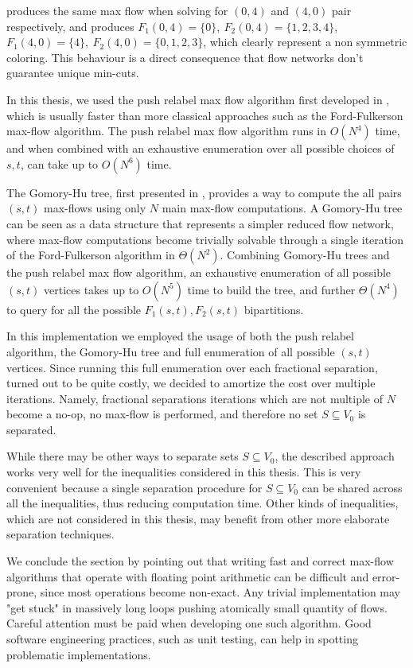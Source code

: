 produces the same max flow when solving for $(0, 4)$ and $(4, 0)$ pair respectively, and produces $F_1(0, 4) = \{ 0\},\ F_2(0, 4) = \{ 1, 2, 3, 4\}$, $F_1(4, 0) = \{ 4 \},\ F_2(4, 0) = \{ 0, 1, 2, 3\}$, which clearly represent a non symmetric coloring.
This behaviour is a direct consequence that flow networks don't guarantee unique min-cuts.

In this thesis, we used the push relabel max flow algorithm first developed in \cite{goldberg1997}, which is usually faster than more classical approaches such as the Ford-Fulkerson max-flow algorithm.
The push relabel max flow algorithm runs in $O(N^4)$ time, and when combined with an exhaustive enumeration over all possible choices of $s, t$, can take up to $O(N^6)$ time.

The Gomory-Hu tree, first presented in \cite{gomory1961}, provides a way to compute the all pairs $(s, t)$ max-flows using only $N$ main max-flow computations.
A Gomory-Hu tree can be seen as a data structure that represents a simpler reduced flow network, where max-flow computations become trivially solvable through a single iteration of the Ford-Fulkerson algorithm in $\Theta(N^2)$.
Combining Gomory-Hu trees and the push relabel max flow algorithm, an exhaustive enumeration of all possible $(s, t)$ vertices takes up to $O(N^5)$ time to build the tree, and further $\Theta(N^4)$ to query for all the possible $F_1(s, t), F_2(s, t)$ bipartitions.

In this implementation we employed the usage of both the push relabel algorithm, the Gomory-Hu tree and full enumeration of all possible $(s, t)$ vertices.
Since running this full enumeration over each fractional separation, turned out to be quite costly, we decided to amortize the cost over multiple iterations.
Namely, fractional separations iterations which are not multiple of $N$ become a no-op, no max-flow is performed, and therefore no set $S \subseteq V_0$ is separated.

While there may be other ways to separate sets $S \subseteq V_0$, the described approach works very well for the inequalities considered in this thesis.
This is very convenient because a single separation procedure for $S \subseteq V_0$ can be shared across all the inequalities, thus reducing computation time.
Other kinds of inequalities, which are not considered in this thesis, may benefit from other more elaborate separation techniques.

We conclude the section by pointing out that writing fast and correct max-flow algorithms that operate with floating point arithmetic can be difficult and error-prone, since most operations become non-exact.
Any trivial implementation may "get stuck" in massively long loops pushing atomically small quantity of flows.
Careful attention must be paid when developing one such algorithm.
Good software engineering practices, such as unit testing, can help in spotting problematic implementations.

